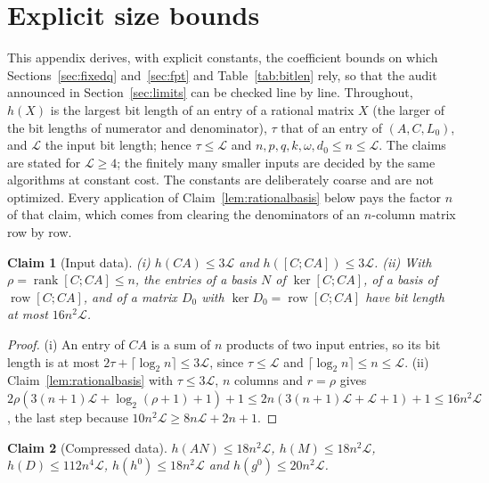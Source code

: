 \documentclass[journal]{IEEEtran}
\theoremstyle{plainn}
\newtheorem{claim}{Claim}
\theoremstyle{remark}
\begin{document}
\appendices

\section{Explicit size bounds}\label{app:size}

This appendix derives, with explicit constants, the coefficient bounds on which
Sections~\ref{sec:fixedq} and~\ref{sec:fpt} and Table~\ref{tab:bitlen} rely, so that the audit announced
in Section~\ref{sec:limits} can be checked line by line. Throughout, $h(X)$ is the largest bit length of
an entry of a rational matrix $X$ (the larger of the bit lengths of numerator and denominator), $\tau$
that of an entry of $(A,C,L_0)$, and $\mathcal L$ the input bit length; hence $\tau\le\mathcal L$ and
$n,p,q,k,\omega,d_0\le n\le\mathcal L$. The claims are stated for $\mathcal L\ge4$; the finitely many
smaller inputs are decided by the same algorithms at constant cost. The constants are deliberately
coarse and are not optimized. Every application of Claim~\ref{lem:rationalbasis} below pays the factor
$n$ of that claim, which comes from clearing the denominators of an $n$-column matrix row by row.

\begin{claim}[Input data]\label{app:input}
(i) $h(CA)\le3\mathcal L$ and $h([C;CA])\le3\mathcal L$.
(ii) With $\rho=\operatorname{rank}[C;CA]\le n$, the entries of a basis $N$ of $\ker[C;CA]$, of a basis
of $\operatorname{row}[C;CA]$, and of a matrix $D_0$ with $\ker D_0=\operatorname{row}[C;CA]$ have bit
length at most $16n^2\mathcal L$.
\end{claim}

\begin{proof}
(i) An entry of $CA$ is a sum of $n$ products of two input entries, so its bit length is at most
$2\tau+\lceil\log_2 n\rceil\le3\mathcal L$, since $\tau\le\mathcal L$ and
$\lceil\log_2 n\rceil\le n\le\mathcal L$. (ii) Claim~\ref{lem:rationalbasis} with $\tau\le3\mathcal L$,
$n$ columns and $r=\rho$ gives
$2\rho(3(n+1)\mathcal L+\log_2(\rho+1)+1)+1\le2n(3(n+1)\mathcal L+\mathcal L+1)+1\le16n^2\mathcal L$,
the last step because $10n^2\mathcal L\ge8n\mathcal L+2n+1$.
\end{proof}

\begin{claim}[Compressed data]\label{app:compressed}
$h(AN)\le18n^2\mathcal L$, $h(M)\le18n^2\mathcal L$, $h(D)\le112n^4\mathcal L$,
$h(h^0)\le18n^2\mathcal L$ and $h(g^0)\le20n^2\mathcal L$.
\end{claim}
\end{document}

